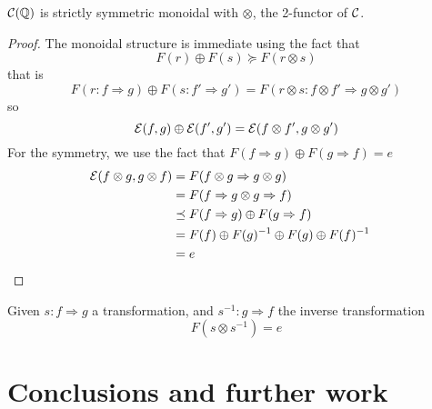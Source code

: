 \documentclass[a4paper]{article}
\begin{document}
\begin{proposition}
${\cal C}(\mathbb{Q})$ is strictly symmetric monoidal with $\otimes$, the 2-functor of ${\cal C}$.

\begin{proof}
The monoidal structure is immediate using the fact that
\[
F(r) \oplus F(s) \succeq F(r \otimes s)
\]
that is
\[
F(r: f \Rightarrow g) \oplus F(s: f' \Rightarrow g') = F(r \otimes s: f \otimes f' \Rightarrow g \otimes g')
\]
so
\[
{\cal E}(f, g) \oplus {\cal E}(f', g') = {\cal E}(f \otimes f', g \otimes g')
\]
For the symmetry, we use the fact that $F(f \Rightarrow g) \oplus F(g \Rightarrow f) = e$
\begin{align}
{\cal E}(f \otimes g, g \otimes f) &= F(f \otimes g \Rightarrow g \otimes g) \cr
&= F(f \Rightarrow g \otimes g \Rightarrow f) \cr
&\preceq F(f \Rightarrow g) \oplus F(g \Rightarrow f) \cr
&= F(f) \oplus F(g)^{-1} \oplus F(g) \oplus F(f)^{-1} \cr
&= e
\end{align}
\end{proof}
\end{proposition}

\begin{corollary}
Given $s: f \Rightarrow g$ a transformation, and $s^{-1}: g \Rightarrow f$ the inverse transformation
\[
F(s \otimes s^{-1}) = e
\]
\end{corollary}


\section{Conclusions and further work}
\label{sec:conclusion}



\small

\end{document}

